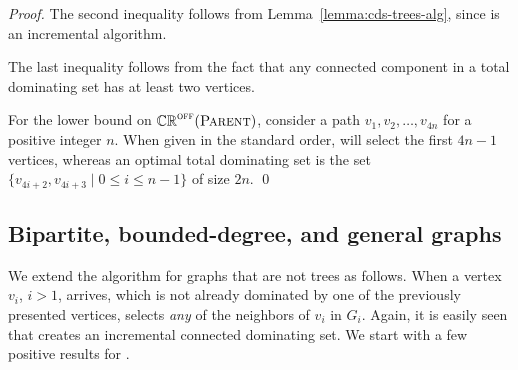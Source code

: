 \begin{proof}
The second inequality follows from Lemma~\ref{lemma:cds-trees-alg},
since \aparent is an incremental algorithm.

The last inequality follows from the fact that any connected component
in a total dominating set has at least two vertices.

For the lower bound on $\mathbb{CR}^{\textsc{off}}(\operatorname{\textsc{Parent}})$, consider a path $v_1,
v_2,\ldots,v_{4n}$ for a positive integer $n$.
When given in the standard order, \aparent will select the first $4n-1$
vertices, whereas an optimal total dominating set is the set $\{v_{4i+2},
v_{4i+3} \mid 0 \leq i \leq n-1\}$ of size $2n$.
\qed\end{proof}


\subsection{Bipartite, bounded-degree, and general graphs}

We extend the \aparent algorithm for graphs that are not trees as
follows. When a vertex $v_i$, $i>1$, arrives, which is not
already dominated by one of the previously presented vertices,
\aparent selects \emph{any} of the neighbors of $v_i$ in $G_i$.
Again, it is easily seen that \aparent creates an incremental
connected dominating set.
We start with a few positive results for \aparent.


